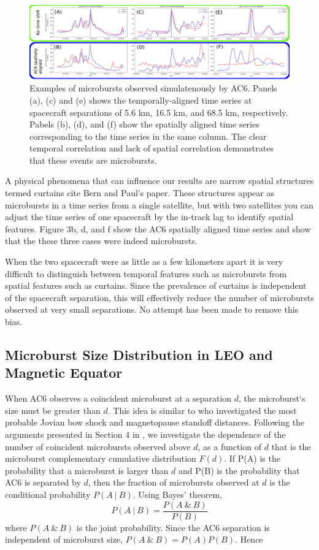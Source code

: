 \documentclass[draft]{agujournal2019}
\begin{document}
\begin{figure}
\includegraphics[width=\textwidth]{fig2.png}
\caption{Examples of microbursts observed simulatenously by AC6. Panels (a), (c) and (e) shows the temporally-aligned time series at spacecraft separations of 5.6 km, 16.5 km, and 68.5 km, respectively. Pabels (b), (d), and (f) show the spatially aligned time series corresponding to the time series in the same column. The clear temporal correlation and lack of spatial correlation demonstrates that these events are microbursts.} \label{fig2}
\end{figure}
	
A physical phenomena that can influence our results are narrow spatial structures termed curtains cite Bern and Paul’s paper. These structures appear as microbursts in a time series from a single satellite, but with two satellites you can adjust the time series of one spacecraft by the in-track lag to identify spatial features. Figure 3b, d, and f show the AC6 spatially aligned time series and show that the these three cases were indeed microbursts.  
	
When the two spacecraft were as little as a few kilometers apart it is very difficult to distinguish between temporal features such as microbursts from spatial features such as curtains. Since the prevalence of curtains is independent of the spacecraft separation, this will effectively reduce the number of microbursts observed at very small separations. No attempt has been made to remove this bias.

\subsection{Microburst Size Distribution in LEO and Magnetic Equator}\label{microburst_distribution}
When AC6 observes a coincident microburst at a separation $d$, the microburst`s size must be greater than $d$. This idea is similar to  who investigated the most probable Jovian bow shock and magnetopause standoff distances. Following the arguments presented in Section 4 in , we investigate the dependence of the number of coincident microbursts observed above $d$, as a function of $d$ that is the microburst complementary cumulative distribution $F(d)$.  If P(A) is the probability that a microburst is larger than $d$ and P(B) is the probability that AC6 is separated by $d$, then the fraction of microbursts observed at $d$ is the conditional probability $P(A \ \vert \ B)$. Using Bayes’ theorem, 
\begin{equation}
P(A \ \vert \ B) = \frac{P(A \ \& \ B)}{P(B)}
\end{equation} where $P(A \ \& \ B)$ is the joint probability. Since the AC6 separation is independent of microburst size, $P(A \ \& \ B) = P(A)P(B)$. Hence
\end{document}
